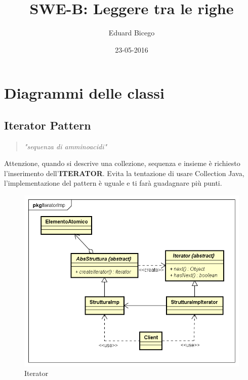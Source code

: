 \documentclass[a4paper,11pt]{article}
\begin{document}
\title{SWE-B: Leggere tra le righe}
\author{Eduard Bicego}
\date{23-05-2016}

\maketitle

\tableofcontents
\newpage
\listoffigures
\newpage


\section{Diagrammi delle classi}

	\subsection{Iterator Pattern}
	
	\begin{quote}
		\textit{"sequenza di amminoacidi"}
	\end{quote}
	
	Attenzione, quando si descrive una collezione, sequenza e insieme è richiesto l'inserimento dell'\textbf{ITERATOR}. Evita la tentazione di usare Collection Java, l'implementazione del pattern è uguale e ti farà guadagnare più punti.
			
			\begin{figure} [h]
				\centering
				\includegraphics[scale=0.5]{ClassDiagramPattern/IteratorImp/IteratorImp}
				\caption{Iterator}
				\label{fig:IteratorImp}
			\end{figure}
\end{document}
